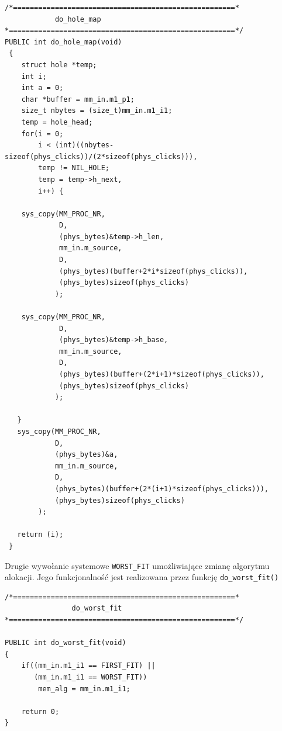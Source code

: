 \documentclass{mwrep}
\begin{document}
\begin{lstlisting}
/*=====================================================*
            do_hole_map				       
*======================================================*/
PUBLIC int do_hole_map(void)
 {
    struct hole *temp;
    int i;
    int a = 0;
    char *buffer = mm_in.m1_p1;
    size_t nbytes = (size_t)mm_in.m1_i1;
    temp = hole_head;
    for(i = 0;  
        i < (int)((nbytes-sizeof(phys_clicks))/(2*sizeof(phys_clicks))), 
        temp != NIL_HOLE; 
        temp = temp->h_next, 
        i++) {	

    sys_copy(MM_PROC_NR,
             D, 
             (phys_bytes)&temp->h_len,
             mm_in.m_source, 
             D, 
             (phys_bytes)(buffer+2*i*sizeof(phys_clicks)), 
             (phys_bytes)sizeof(phys_clicks)
            );

    sys_copy(MM_PROC_NR, 
             D, 
             (phys_bytes)&temp->h_base,
             mm_in.m_source, 
             D, 
             (phys_bytes)(buffer+(2*i+1)*sizeof(phys_clicks)), 
             (phys_bytes)sizeof(phys_clicks)
            );

   }
   sys_copy(MM_PROC_NR, 
            D, 
            (phys_bytes)&a, 
            mm_in.m_source, 
            D, 
            (phys_bytes)(buffer+(2*(i+1)*sizeof(phys_clicks))), 
            (phys_bytes)sizeof(phys_clicks)
        );

   return (i);
 }
\end{lstlisting}

Drugie wywołanie systemowe \texttt{WORST\_{}FIT} umożliwiające zmianę algorytmu 
alokacji. Jego funkcjonalność jest realizowana przez funkcję \texttt{do\_{}worst\_{}fit()}

\begin{lstlisting}
/*=====================================================*
                do_worst_fit    				       
*======================================================*/

PUBLIC int do_worst_fit(void)
{
    if((mm_in.m1_i1 == FIRST_FIT) || 
       (mm_in.m1_i1 == WORST_FIT)) 
        mem_alg = mm_in.m1_i1;

    return 0;
}

\end{lstlisting}
\end{document}
